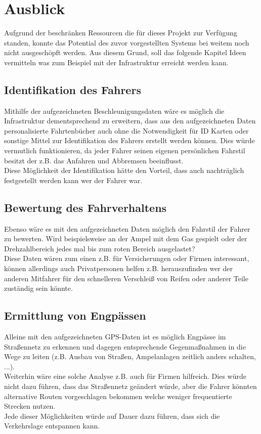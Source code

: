 \chapter{Ausblick}
\label{sec:outlook}
Aufgrund der beschränken Ressourcen die für dieses Projekt zur Verfügung standen, konnte das Potential des zuvor vorgestellten Systems bei weitem noch nicht ausgeschöpft werden. Aus diesem Grund, soll das folgende Kapitel Ideen vermitteln was zum Beispiel mit der Infrastruktur erreicht werden kann.

\section{Identifikation des Fahrers}
Mithilfe der aufgezeichneten Beschleunigungsdaten wäre es möglich die Infrastruktur dementsprechend zu erweitern, dass aus den aufgezeichneten Daten personalisierte Fahrtenbücher auch ohne die Notwendigkeit für ID Karten oder sonstige Mittel zur Identifikation des Fahrers erstellt werden können. Dies würde vermutlich funktionieren, da jeder Fahrer seinen eigenen persönlichen Fahrstil besitzt der z.B. das Anfahren und Abbremsen beeinflusst. 
\\
Diese Möglichkeit der Identifikation hätte den Vorteil, dass auch nachträglich festgestellt werden kann wer der Fahrer war.

\section{Bewertung des Fahrverhaltens}
Ebenso wäre es mit den aufgezeichneten Daten möglich den Fahrstil der Fahrer zu bewerten. Wird beispielsweise an der Ampel mit dem Gas gespielt oder der Drehzahlbereich jedes mal bis zum roten Bereich ausgelastet?
\\
Diese Daten wären zum einen z.B. für Versicherungen oder Firmen interessant, können allerdings auch Privatpersonen helfen z.B. herauszufinden wer der anderen Mitfahrer für den schnelleren Verschleiß von Reifen oder anderer Teile zuständig sein könnte.

\section{Ermittlung von Engpässen}
\label{SecErmittlungVonEngpaessen}
Alleine mit den aufgezeichneten GPS-Daten ist es möglich Engpässe im Straßennetz zu erkennen und dagegen entsprechende Gegenmaßnahmen in die Wege zu leiten (z.B. Ausbau von Straßen, Ampelanlagen zeitlich anders schalten, ...). 
\\
Weiterhin wäre eine solche Analyse z.B. auch für Firmen hilfreich. Dies würde nicht dazu führen, dass das Straßennetz geändert würde, aber die Fahrer könnten alternative Routen vorgeschlagen bekommen welche weniger frequentierte Strecken nutzen.
\\
Jede dieser Möglichkeiten würde auf Dauer dazu führen, dass sich die Verkehrslage entspannen kann.

